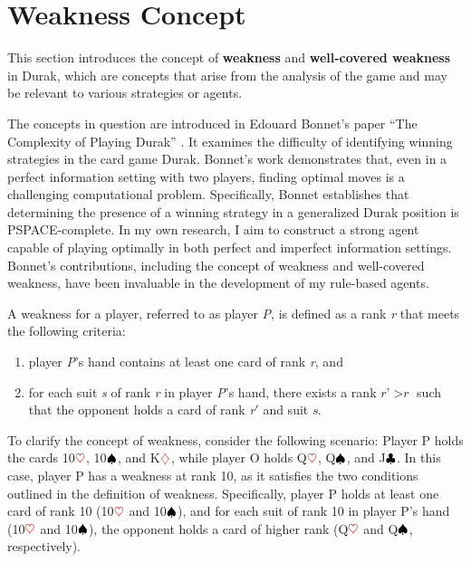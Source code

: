 \section{Weakness Concept}
\label{weaknessConcept}
This section introduces the concept of \textbf{weakness} and \textbf{well-covered weakness} in Durak, which are concepts that arise from the analysis of the game and may be relevant to various strategies or agents.

The concepts in question are introduced in Edouard Bonnet's paper ``The Complexity of Playing Durak'' \citep{Bonnet2016TheCO}. It examines the difficulty of identifying winning strategies in the card game Durak. Bonnet's work demonstrates that, even in a perfect information setting with two players, finding optimal moves is a challenging computational problem. Specifically, Bonnet establishes that determining the presence of a winning strategy in a generalized Durak position is PSPACE-complete. In my own research, I aim to construct a strong agent capable of playing optimally in both perfect and imperfect information settings. Bonnet's contributions, including the concept of weakness and well-covered weakness, have been invaluable in the development of my rule-based agents.

A weakness for a player, referred to as player \textit{P}, is defined as a rank \textit{r} that meets the following criteria: 
\begin{enumerate}
	\item player \textit{P}'s hand contains at least one card of rank \textit{r}, and
	\item for each suit \textit{s} of rank \textit{r} in player \textit{P}'s hand, there exists a rank $\textit{r}$'$ > \textit{r}$ such that the opponent holds a card of rank \textit{r}$'$ and suit \textit{s}.
\end{enumerate}

To clarify the concept of weakness, consider the following scenario: Player P holds the cards 10$\textcolor{red}{\heartsuit}$, 10$\textcolor{black}{\spadesuit}$, and K$\textcolor{red}{\diamondsuit}$, while player O holds Q$\textcolor{red}{\heartsuit}$, Q$\textcolor{black}{\spadesuit}$, and J$\textcolor{black}{\clubsuit}$. In this case, player P has a weakness at rank 10, as it satisfies the two conditions outlined in the definition of weakness. Specifically, player P holds at least one card of rank 10 (10$\textcolor{red}{\heartsuit}$ and 10$\textcolor{black}{\spadesuit}$), and for each suit of rank 10 in player P's hand (10$\textcolor{red}{\heartsuit}$ and 10$\textcolor{black}{\spadesuit}$), the opponent holds a card of higher rank (Q$\textcolor{red}{\heartsuit}$ and Q$\textcolor{black}{\spadesuit}$, respectively).

